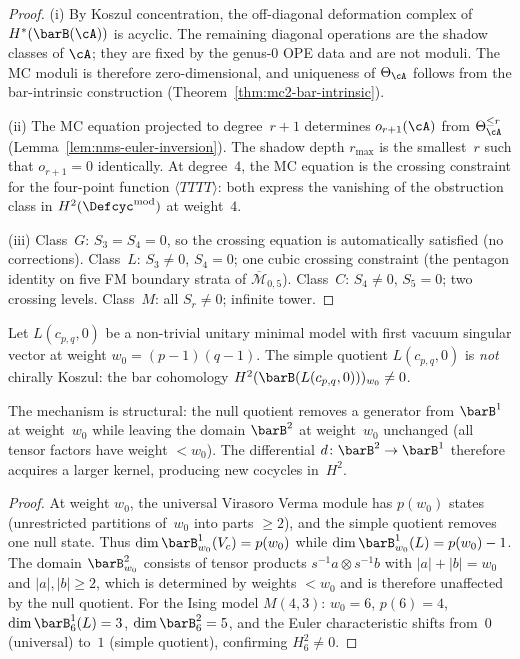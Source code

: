 \begin{proof}
(i) By Koszul concentration, the off-diagonal deformation complex of
$H^*(\barB(\cA))$ is acyclic. The remaining diagonal operations are the
shadow classes of $\cA$; they are fixed by the genus-$0$ OPE data and
are not moduli. The MC moduli is therefore zero-dimensional, and
uniqueness of $\Theta_\cA$ follows from the bar-intrinsic construction
(Theorem~\ref{thm:mc2-bar-intrinsic}).

(ii) The MC equation projected to degree~$r{+}1$ determines
$o_{r+1}(\cA)$ from $\Theta_\cA^{\leq r}$
(Lemma~\ref{lem:nms-euler-inversion}). The shadow depth
$r_{\max}$ is the smallest~$r$ such that
$o_{r+1} = 0$ identically. At degree~$4$, the MC
equation is the crossing constraint for the four-point
function $\langle TTTT \rangle$: both express the
vanishing of the obstruction class in
$H^2(\Defcyc^{\mathrm{mod}})$ at weight~$4$.

(iii) Class~$G$: $S_3 = S_4 = 0$, so the crossing
equation is automatically satisfied (no corrections).
Class~$L$: $S_3 \neq 0$, $S_4 = 0$; one cubic crossing
constraint (the pentagon identity on five FM boundary
strata of $\overline{\mathcal{M}}_{0,5}$).
Class~$C$: $S_4 \neq 0$, $S_5 = 0$; two crossing levels.
Class~$M$: all $S_r \neq 0$; infinite tower.
\end{proof}

\begin{proposition}
\label{prop:minimal-model-non-koszul}
Let $L(c_{p,q}, 0)$ be a non-trivial unitary minimal model
with first vacuum singular vector at
weight $w_0 = (p{-}1)(q{-}1)$. The simple quotient
$L(c_{p,q}, 0)$ is \emph{not} chirally Koszul: the bar
cohomology
$H^2(\barB(L(c_{p,q},0)))_{w_0} \neq 0$.

The mechanism is structural:
the null quotient removes a generator from
$\barB^1$ at weight~$w_0$ while leaving the domain
$\barB^2$ at weight~$w_0$ unchanged
\textup{(}all tensor factors have weight $< w_0$\textup{)}.
The differential $d\colon \barB^2 \to \barB^1$
therefore acquires a larger kernel, producing new
cocycles in~$H^2$.
\end{proposition}

\begin{proof}
At weight $w_0$, the universal Virasoro Verma module has
$p(w_0)$ states (unrestricted partitions of~$w_0$ into parts
$\geq 2$), and the simple quotient removes one null state.
Thus $\dim \barB^1_{w_0}(V_{c}) = p(w_0)$ while
$\dim \barB^1_{w_0}(L) = p(w_0) - 1$. The domain
$\barB^2_{w_0}$ consists of tensor products
$s^{-1}a \otimes s^{-1}b$ with $|a| + |b| = w_0$ and
$|a|, |b| \geq 2$, which is determined by weights
$< w_0$ and is therefore unaffected by the null quotient.
For the Ising model $M(4,3)$: $w_0 = 6$, $p(6) = 4$,
$\dim \barB^1_6(L) = 3$, $\dim \barB^2_6 = 5$, and the
Euler characteristic shifts from~$0$ (universal) to~$1$
(simple quotient), confirming $H^2_6 \neq 0$.
\end{proof}

